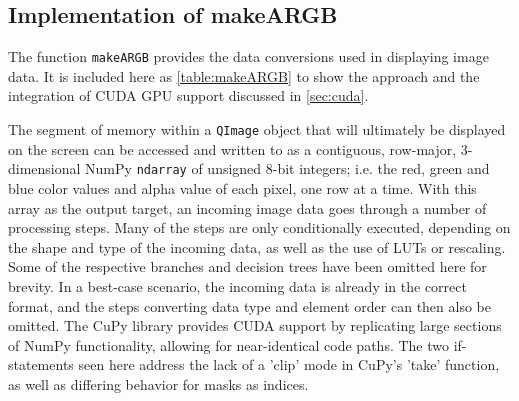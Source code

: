 \documentclass[journal]{vgtc}                %
\begin{document}
\subsection{Implementation of makeARGB}
\label{app_makeARGB}

The function \texttt{makeARGB} provides the data conversions used in displaying image data. It is included here as \autoref{table:makeARGB} to show the approach and the integration of CUDA GPU support discussed in \autoref{sec:cuda}.

The segment of memory within a \texttt{QImage} object that will ultimately be displayed on the screen can be accessed and written to as a contiguous, row-major, 3-dimensional NumPy \texttt{ndarray} of unsigned 8-bit integers; i.e. the red, green and blue color values and alpha value of each pixel, one row at a time. With this array as the output target, an incoming image data goes through a number of processing steps. Many of the steps are only conditionally executed, depending on the shape and type of the incoming data, as well as the use of LUTs or rescaling. Some of the respective branches and decision trees have been omitted here for brevity. In a best-case scenario, the incoming data is already in the correct format, and the steps converting data type and element order can then also  be omitted. The CuPy library provides CUDA support by replicating large sections of NumPy functionality, allowing for near-identical code paths. The two if-statements seen here address the lack of a 'clip' mode in CuPy's 'take' function, as well as differing behavior for masks as indices.




%

%
%
%

\end{document}
